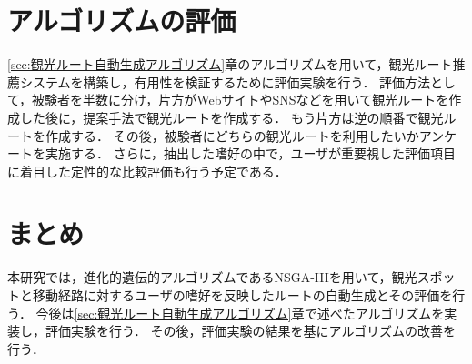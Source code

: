\section{アルゴリズムの評価}\label{sec:アルゴリズムの評価}
\ref{sec:観光ルート自動生成アルゴリズム}章のアルゴリズムを用いて，観光ルート推薦システムを構築し，有用性を検証するために評価実験を行う．
評価方法として，被験者を半数に分け，片方がWebサイトやSNSなどを用いて観光ルートを作成した後に，提案手法で観光ルートを作成する．
もう片方は逆の順番で観光ルートを作成する．
その後，被験者にどちらの観光ルートを利用したいかアンケートを実施する．
さらに，抽出した嗜好の中で，ユーザが重要視した評価項目に着目した定性的な比較評価も行う予定である．

\section{まとめ}\label{sec:まとめ}
本研究では，進化的遺伝的アルゴリズムであるNSGA-I\hspace{-.1em}I\hspace{-.1em}Iを用いて，観光スポットと移動経路に対するユーザの嗜好を反映したルートの自動生成とその評価を行う．
今後は\ref{sec:観光ルート自動生成アルゴリズム}章で述べたアルゴリズムを実装し，評価実験を行う．
その後，評価実験の結果を基にアルゴリズムの改善を行う．






